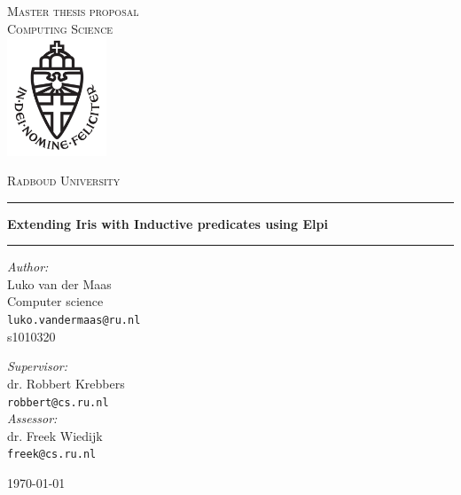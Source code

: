 \documentclass[11pt,a4paper,final]{report}
\begin{document}
\renewcommand{\sectionautorefname}{Section}
\renewcommand{\subsectionautorefname}{Section}
\renewcommand{\chapterautorefname}{Chapter}

\begin{titlepage}
    \begin{center}
        \textsc{\LARGE Master thesis proposal\\Computing Science}\\[1.5cm]
        \includegraphics[height=100pt]{logo}

        \vspace{0.4cm}
        \textsc{\Large Radboud University}\\[1cm]
        \hrule
        \vspace{0.4cm}
        \textbf{\huge Extending Iris with Inductive predicates using Elpi}\\[0.4cm]
        \hrule
        \vspace{2cm}
        \begin{minipage}[t]{0.45\textwidth}
            \begin{flushleft} \large
                \textit{Author:}\\
                Luko van der Maas\\
                Computer science\\
                \texttt{luko.vandermaas@ru.nl}\\
                s1010320
            \end{flushleft}
        \end{minipage}
        \begin{minipage}[t]{0.45\textwidth}
            \begin{flushright} \large
                \textit{Supervisor:}\\
                dr. Robbert Krebbers\\
                \texttt{robbert@cs.ru.nl}\\[1.3cm]
                \textit{Assessor:}\\
                dr. Freek Wiedijk\\
                \texttt{freek@cs.ru.nl}
            \end{flushright}
        \end{minipage}
        \vfill
        {\large \today}
    \end{center}
\end{titlepage}
\end{document}
